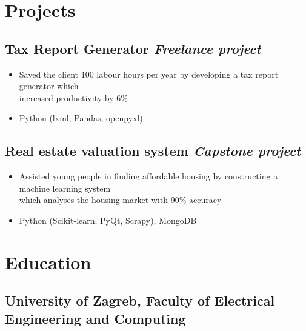 \documentclass[a4paper]{article}
\newcommand{\bolditalicpair}
[2]
{\textbf{#1} \texorpdfstring{\hfill}{} \textit{#2}}
\begin{document}
\section{Projects}
\subsection{\bolditalicpair{Tax Report Generator}{Freelance project}}

\begin{itemize}
  \item Saved the client 100 labour hours per year by developing a tax report generator which \\
  increased productivity by 6\%
  \item Python (lxml, Pandas, openpyxl)
\end{itemize}

\subsection{\bolditalicpair{Real estate valuation system}{Capstone project}}

\begin{itemize}
  \item Assisted young people in finding affordable housing by constructing a machine learning system \\
  which analyses the housing market with 90\% accuracy
  \item Python (Scikit-learn, PyQt, Scrapy), MongoDB
\end{itemize}





\section{Education}
\subsection{\bolditalicpair{University of Zagreb, Faculty of Electrical Engineering and Computing}{}}
\end{document}
